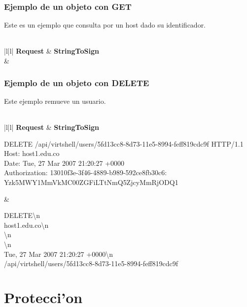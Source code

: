 \subsubsection{Ejemplo de un objeto con GET}

Este es un ejemplo que consulta por un host dado su identificador. \\
\\
\vspace{1cm}
\scriptsize
\begin{tabular}{|l|l|} \hline
\textbf{Request} & \textbf{StringToSign} \\ \hline
{} & 
 \tabularnewline \hline
\end{tabular}
\normalsize

\subsubsection{Ejemplo de un objeto con DELETE}

Este ejemplo remueve un usuario.\\
\\
\vspace{1cm}
\scriptsize
\begin{tabular}{|l|l|} \hline
\textbf{Request} & \textbf{StringToSign} \\ \hline
{}%
{\raggedright DELETE /api/virtshell/users/5fd13cc8-8d73-11e5-8994-feff819cdc9f HTTP/1.1 \\
 Host: host1.edu.co \\
 Date: Tue, 27 Mar 2007 21:20:27 +0000 \\
 Authorization: 13010f3e-3f46-4889-b989-592ce8fb30c6: Yzk5MWY1MmVkMC00ZGFiLTtNmQ5ZjcyMmRjODQ1 } & %
{\raggedright DELETE\textbackslash{}n \\
 host1.edu.co\textbackslash{}n \\
 \textbackslash{}n \\
 \textbackslash{}n \\
 Tue, 27 Mar 2007 21:20:27 +0000\textbackslash{}n \\ /api/virtshell/users/5fd13cc8-8d73-11e5-8994-feff819cdc9f} \tabularnewline \hline
\end{tabular}

\normalsize
\section{Protecci'on}

